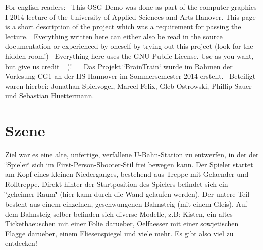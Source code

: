 For english readers\+:~\newline
 This O\+S\+G-\/\+Demo was done as part of the computer graphics I 2014 lecture of the University of Applied Sciences and Arts Hanover. This page is a short description of the project which was a requirement for passing the lecture.~\newline
 Everything written here can either also be read in the source documentation or experienced by oneself by trying out this project (look for the hidden room!)~\newline
 Everything here uses the G\+N\+U Public License. Use as you want, but give us credit =)!~\newline
 ~\newline
 Das Projekt \char`\"{}\+Brain\+Train\char`\"{} wurde im Rahmen der Vorlesung C\+G1 an der H\+S Hannover im Sommersemester 2014 erstellt.~\newline
 Beteiligt waren hierbei\+: Jonathan Spielvogel, Marcel Felix, Gleb Ostrowski, Phillip Sauer und Sebastian Huettermann.\hypertarget{index_Die}{}\section{Szene}\label{index_Die}
Ziel war es eine alte, unfertige, verfallene U-\/\+Bahn-\/\+Station zu entwerfen, in der der \char`\"{}\+Spieler\char`\"{} sich im First-\/\+Person-\/\+Shooter-\/\+Stil frei bewegen kann. Der Spieler startet am Kopf eines kleinen Niederganges, bestehend aus Treppe mit Gelaender und Rolltreppe. Direkt hinter der Startposition des Spielers befindet sich ein \char`\"{}geheimer Raum\char`\"{} (hier kann durch die Wand gelaufen werden). Der untere Teil besteht aus einem einzelnen, geschwungenen Bahnsteig (mit einem Gleis). Auf dem Bahnsteig selber befinden sich diverse Modelle, z.\+B\+: Kisten, ein altes Tickethaeuschen mit einer Folie darueber, Oelfaesser mit einer sowjetischen Flagge darueber, einem Fliesenspiegel und viele mehr. Es gibt also viel zu entdecken!

